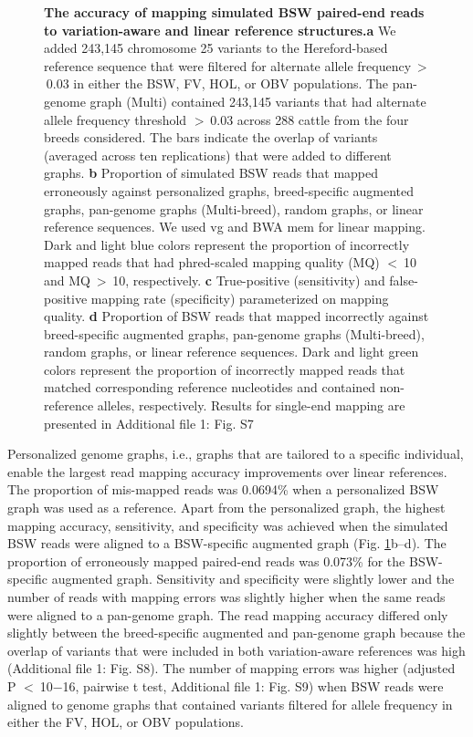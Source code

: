 \documentclass[../main.tex]{subfiles}
\begin{document}
\begin{figure}[!htb]
    \centering
    \caption[Read mapping across cattle graphs combination]{\textbf{The accuracy of mapping simulated BSW paired-end reads to variation-aware and linear reference structures.}\small{\textbf{a} We added 243,145 chromosome 25 variants to the Hereford-based reference sequence that were filtered for alternate allele frequency $>$ 0.03 in either the BSW, FV, HOL, or OBV populations. The pan-genome graph (Multi) contained 243,145 variants that had alternate allele frequency threshold $>$ 0.03 across 288 cattle from the four breeds considered. The bars indicate the overlap of variants (averaged across ten replications) that were added to different graphs. \textbf{b} Proportion of simulated BSW reads that mapped erroneously against personalized graphs, breed-specific augmented graphs, pan-genome graphs (Multi-breed), random graphs, or linear reference sequences. We used vg and BWA mem for linear mapping. Dark and light blue colors represent the proportion of incorrectly mapped reads that had phred-scaled mapping quality (MQ) $<$ 10 and MQ $>$ 10, respectively. \textbf{c} True-positive (sensitivity) and false-positive mapping rate (specificity) parameterized on mapping quality. \textbf{d} Proportion of BSW reads that mapped incorrectly against breed-specific augmented graphs, pan-genome graphs (Multi-breed), random graphs, or linear reference sequences. Dark and light green colors represent the proportion of incorrectly mapped reads that matched corresponding reference nucleotides and contained non-reference alleles, respectively. Results for single-end mapping are presented in Additional file 1: Fig. S7}}
    \label{fig34:breed}
\end{figure}


Personalized genome graphs, i.e., graphs that are tailored to a specific individual, enable the largest read mapping accuracy improvements over linear references. The proportion of mis-mapped reads was 0.0694\% when a personalized BSW graph was used as a reference. Apart from the personalized graph, the highest mapping accuracy, sensitivity, and specificity was achieved when the simulated BSW reads were aligned to a BSW-specific augmented graph (Fig. \ref{fig34:breed}b–d). The proportion of erroneously mapped paired-end reads was 0.073\% for the BSW-specific augmented graph. Sensitivity and specificity were slightly lower and the number of reads with mapping errors was slightly higher when the same reads were aligned to a pan-genome graph. The read mapping accuracy differed only slightly between the breed-specific augmented and pan-genome graph because the overlap of variants that were included in both variation-aware references was high (Additional file 1: Fig. S8). The number of mapping errors was higher (adjusted P $<$ 10−16, pairwise t test, Additional file 1: Fig. S9) when BSW reads were aligned to genome graphs that contained variants filtered for allele frequency in either the FV, HOL, or OBV populations.
\end{document}
